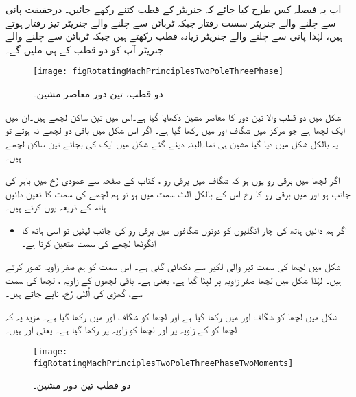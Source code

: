  اب یہ فیصلہ کس طرح کیا جائے کہ جنریٹر کے قطب کتنے رکھے جائیں۔ درحقیقت پانی سے چلنے والے جنریٹر سست رفتار جبکہ ٹربائن سے چلنے والے جنریٹر تیز رفتار ہوتے ہیں، لہٰذا پانی سے چلنے والے جنریٹر زیادہ قطب رکھتے ہیں جبکہ ٹربائن سے چلنے والے جنریٹر آپ کو دو قطب کے ہی ملیں گے۔
\begin{figure}
\centering
\texttt{[image: figRotatingMachPrinciplesTwoPoleThreePhase]}
\caption{دو قطب، تین دور معاصر مشین۔}
\label{شکل_گھومتے_مشین_دو_قطب_تین_دور_معاصر}
\end{figure}

شکل   میں دو قطب والا تین دور کا معاصر مشین دکھایا گیا ہے۔اس میں تین ساکن لچھے ہیں۔ان میں ایک لچھا  ہے جو مرکز میں  شگاف   اور  میں رکھا گیا ہے۔ اگر اس شکل میں باقی دو لچھے نہ ہوتے تو یہ بالکل شکل   میں دیا گیا مشین ہی تھا۔البتہ دیئے گئے شکل میں ایک کی بجائے تین ساکن لچھے ہیں۔

 اگر  لچھا  میں برقی رو یوں ہو کہ شگاف  میں برقی رو ، کتاب کے صفحہ سے عمودی رُخ میں باہر کی جانب ہو اور   میں برقی رو کا رخ اس کے بالکل الٹ سمت میں ہو تو ہم لچھے کی سمت کا تعین دائیں ہاتھ کے ذریعہ یوں کرتے ہیں۔

\begin{itemize}
\item
اگر ہم دائیں ہاتھ کی چار انگلیوں کو دونوں شگافوں میں برقی رو کی جانب لپٹیں تو اسی ہاتھ کا انگوٹھا لچھے کی سمت متعین کرتا ہے۔
\end{itemize}

 شکل   میں لچھا  کی سمت تیر والی لکیر سے دکھائی گئی ہے۔ اس سمت کو ہم صفر زاویہ تصور کرتے ہیں۔ لہٰذا شکل میں  لچھا صفر زاویہ پر لپٹا گیا ہے، یعنی  ہے۔ باقی لچھوں کے زاویہ ، لچھا  کی سمت سے، گھڑی کی اُلٹی رُخ، ناپے جاتے ہیں۔

شکل   میں لچھا  کو شگاف  اور  میں رکھا گیا ہے اور لچھا  کو شگاف  اور  میں رکھا گیا ہے۔ مزید یہ کہ لچھا  کو  کے زاویہ پر اور لچھا  کو  زاویہ پر رکھا گیا ہے۔ یعنی  اور  ہیں۔
\begin{figure}
\centering
\texttt{[image: figRotatingMachPrinciplesTwoPoleThreePhaseTwoMoments]}
\caption{دو قطب تین دور مشین۔}
\label{شکل_گھومتے_مشین_دو_قطب_تین_دور_مختلف_لمحات}
\end{figure}

